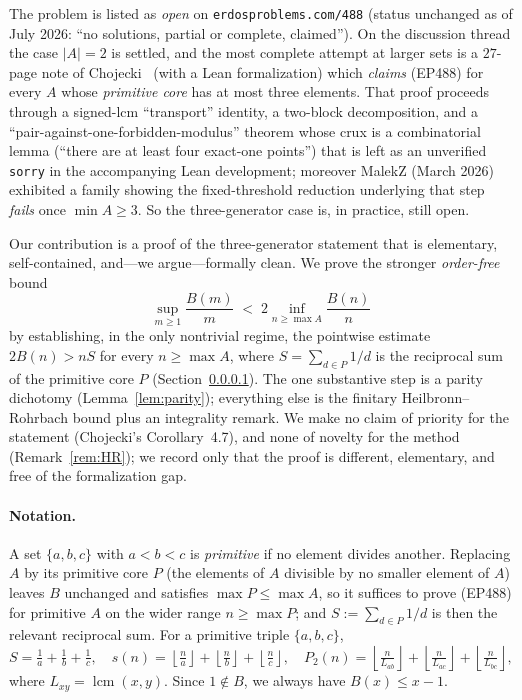 \documentclass[11pt]{article}
\theoremstyle{remark}
\newcommand{\lcm}{\operatorname{lcm}}
\newcommand{\floor}[1]{\left\lfloor #1 \right\rfloor}
\begin{document}
The problem is listed as \emph{open} on \texttt{erdosproblems.com/488} (status
unchanged as of July 2026: ``no solutions, partial or complete, claimed''). On the
discussion thread the case $|A|=2$ is settled, and the most complete attempt at
larger sets is a $27$-page note of Chojecki~\cite{Chojecki} (with a Lean
formalization) which \emph{claims} (EP488) for every $A$ whose \emph{primitive
core} has at most three elements. That proof proceeds through a signed-lcm
``transport'' identity, a two-block decomposition, and a
``pair-against-one-forbidden-modulus'' theorem whose crux is a combinatorial
lemma (``there are at least four exact-one points'') that is left as an unverified
\texttt{sorry} in the accompanying Lean development; moreover MalekZ (March 2026)
exhibited a family showing the fixed-threshold reduction underlying that step
\emph{fails} once $\min A\ge 3$. So the three-generator case is, in practice,
still open.

Our contribution is a proof of the three-generator statement that is elementary,
self-contained, and---we argue---formally clean. We prove the stronger
\emph{order-free} bound
\[
   \sup_{m\ge 1}\frac{B(m)}{m} \;<\; 2\inf_{n\ge \max A}\frac{B(n)}{n}
\]
by establishing, in the only nontrivial regime, the pointwise estimate
$2B(n) > nS$ for every $n\ge\max A$, where $S=\sum_{d\in P}1/d$ is the reciprocal
sum of the primitive core $P$ (Section~\ref{sec:notation}). The one substantive
step is a parity dichotomy (Lemma~\ref{lem:parity}); everything else is the
finitary Heilbronn--Rohrbach bound plus an integrality remark. We make no claim of
priority for the statement (Chojecki's Corollary~4.7), and none of novelty for the
method (Remark~\ref{rem:HR}); we record only that the proof is different,
elementary, and free of the formalization gap.

\paragraph{Notation.}\label{sec:notation} A set $\{a,b,c\}$ with $a<b<c$ is
\emph{primitive} if no element divides another. Replacing $A$ by its primitive
core $P$ (the elements of $A$ divisible by no smaller element of $A$) leaves $B$
unchanged and satisfies $\max P\le\max A$, so it suffices to prove (EP488) for
primitive $A$ on the wider range $n\ge\max P$; and $S:=\sum_{d\in P}1/d$ is then
the relevant reciprocal sum. For a primitive triple $\{a,b,c\}$,
\[
  S=\tfrac1a+\tfrac1b+\tfrac1c,\quad
  s(n)=\floor{\tfrac na}+\floor{\tfrac nb}+\floor{\tfrac nc},\quad
  P_2(n)=\floor{\tfrac n{L_{ab}}}+\floor{\tfrac n{L_{ac}}}+\floor{\tfrac n{L_{bc}}},
\]
where $L_{xy}=\lcm(x,y)$. Since $1\notin B$, we always have $B(x)\le x-1$.
\end{document}
